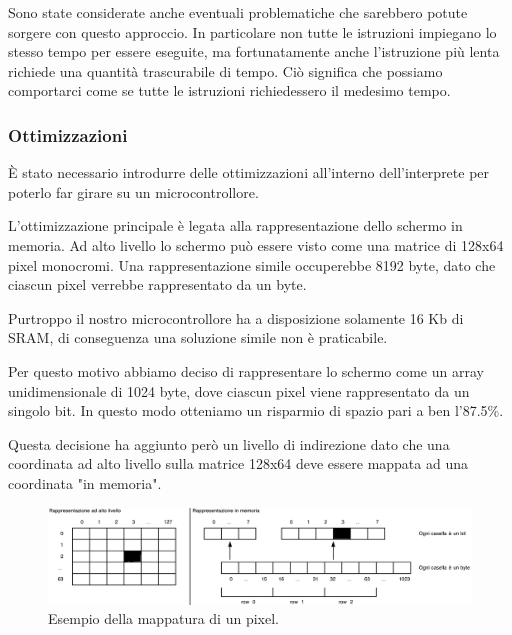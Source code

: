 \documentclass[a4paper]{article}
\begin{document}
Sono state considerate anche eventuali problematiche che sarebbero potute sorgere con questo
approccio. In particolare non tutte le istruzioni impiegano lo stesso tempo per essere eseguite,
ma fortunatamente anche l'istruzione più lenta richiede una quantità trascurabile di tempo.
Ciò significa che possiamo comportarci come se tutte le istruzioni richiedessero il medesimo tempo.

\subsubsection{Ottimizzazioni}

È stato necessario introdurre delle ottimizzazioni all'interno
dell'interprete per poterlo far girare su un microcontrollore.

L'ottimizzazione principale è legata alla rappresentazione dello
schermo in memoria. Ad alto livello lo schermo può essere visto
come una matrice di 128x64 pixel monocromi. Una rappresentazione
simile occuperebbe 8192 byte, dato che ciascun pixel verrebbe
rappresentato da un byte.

Purtroppo il nostro microcontrollore ha a disposizione solamente 16 Kb di SRAM, di conseguenza
una soluzione simile non è praticabile.

\clearpage

Per questo motivo abbiamo deciso di rappresentare lo schermo come un array unidimensionale di
1024 byte, dove ciascun pixel viene rappresentato da un singolo bit. In questo modo otteniamo
un risparmio di spazio pari a ben l'87.5\%.

Questa decisione ha aggiunto però un livello di indirezione dato
che una coordinata ad alto livello sulla matrice 128x64 deve essere
mappata ad una coordinata "in memoria".

\begin{figure}[h!t]
    \begin{center}
        \includegraphics[scale=0.38]{figures/screenopt_small.pdf}
    \end{center}
    \caption{Esempio della mappatura di un pixel.}
    \label{fig:screenopt}
\end{figure}
\end{document}
